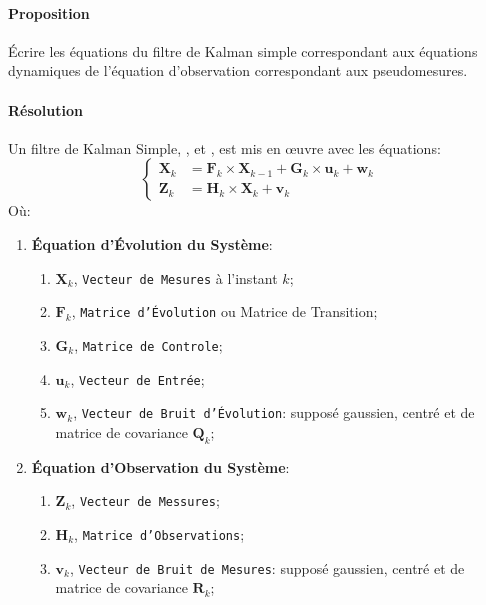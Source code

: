 \documentclass{article}
\begin{document}
\paragraph{Proposition}Écrire les équations du filtre de Kalman simple correspondant aux équations dynamiques de l'équation d'observation correspondant aux pseudomesures.

\paragraph{Résolution}Un filtre de Kalman Simple, \cite{kalmanFilterWiki}, \cite{kalmanFilterMATLAB} et \cite{kalmanFilterMonashUniversity}, est mis en œuvre avec les équations:
\begin{equation*}
    \begin{cases}
        \mathbf{X}_{k} &= \mathbf{F}_{k} \times \mathbf{X}_{k-1} + \mathbf{G}_{k} \times \mathbf{u}_{k} + \mathbf{w}_{k}\\
        \mathbf{Z}_{k} &= \mathbf{H}_{k} \times \mathbf{X}_{k} + \mathbf{v}_{k}
    \end{cases}
\end{equation*}
Où:
\begin{enumerate}
    \item \textbf{Équation d'Évolution du Système}:
    \begin{enumerate}[noitemsep]
        \item $\mathbf{X}_{k}$, \texttt{Vecteur de Mesures} à l'instant $k$;
        \item $\mathbf{F}_{k}$, \texttt{Matrice d'Évolution} ou Matrice de Transition;
        \item $\mathbf{G}_{k}$, \texttt{Matrice de Controle};
        \item $\mathbf{u}_{k}$, \texttt{Vecteur de Entrée};
        \item $\mathbf{w}_{k}$, \texttt{Vecteur de Bruit d'Évolution}: supposé gaussien, centré et de matrice de covariance $\mathbf{Q}_{k}$;
    \end{enumerate}
    \item \textbf{Équation d'Observation du Système}:
    \begin{enumerate}[noitemsep]
        \item $\mathbf{Z}_{k}$, \texttt{Vecteur de Messures};
        \item $\mathbf{H}_{k}$, \texttt{Matrice d'Observations};
        \item $\mathbf{v}_{k}$, \texttt{Vecteur de Bruit de Mesures}: supposé gaussien, centré et de matrice de covariance $\mathbf{R}_{k}$;
    \end{enumerate}
\end{enumerate}
\end{document}
